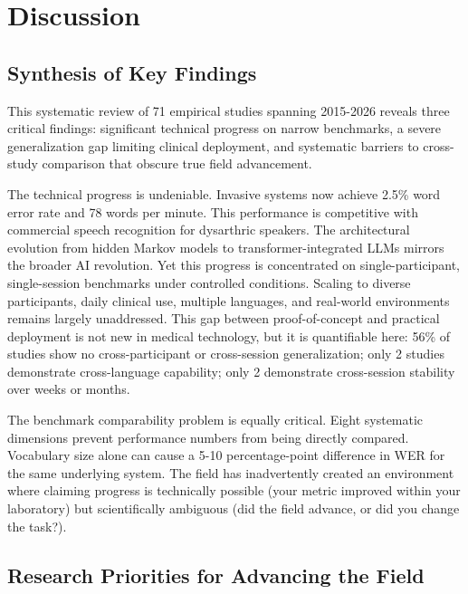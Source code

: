 
\section{Discussion}
\label{sec:discussion}

\subsection{Synthesis of Key Findings}

This systematic review of 71 empirical studies spanning 2015-2026 reveals three critical findings: significant technical progress on narrow benchmarks, a severe generalization gap limiting clinical deployment, and systematic barriers to cross-study comparison that obscure true field advancement.

The technical progress is undeniable. Invasive systems now achieve 2.5\% word error rate and 78 words per minute. This performance is competitive with commercial speech recognition for dysarthric speakers. The architectural evolution from hidden Markov models to transformer-integrated LLMs mirrors the broader AI revolution. Yet this progress is concentrated on single-participant, single-session benchmarks under controlled conditions. Scaling to diverse participants, daily clinical use, multiple languages, and real-world environments remains largely unaddressed. This gap between proof-of-concept and practical deployment is not new in medical technology, but it is quantifiable here: 56\% of studies show no cross-participant or cross-session generalization; only 2 studies demonstrate cross-language capability; only 2 demonstrate cross-session stability over weeks or months.

The benchmark comparability problem is equally critical. Eight systematic dimensions prevent performance numbers from being directly compared. Vocabulary size alone can cause a 5-10 percentage-point difference in WER for the same underlying system. The field has inadvertently created an environment where claiming progress is technically possible (your metric improved within your laboratory) but scientifically ambiguous (did the field advance, or did you change the task?).

\subsection{Research Priorities for Advancing the Field}
\label{sec:priorities}

